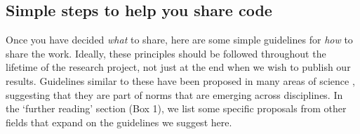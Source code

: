 \documentclass[11pt]{article}
\begin{document}
\subsection*{Simple steps to help you share code}

Once you have decided \textit{what} to share, here are some simple
guidelines for \textit{how} to share the work.  Ideally, these
principles should be followed throughout the lifetime of the research
project, not just at the end when we wish to publish our
results. Guidelines similar to these have been proposed in many areas
of science \cite{Nosek2015,Miguel2014,stodden2012journals},
suggesting that they are part of norms that are emerging across
disciplines. In the `further reading' section (Box 1), we list some
specific proposals from other fields that expand on the guidelines we
suggest here.
\end{document}
